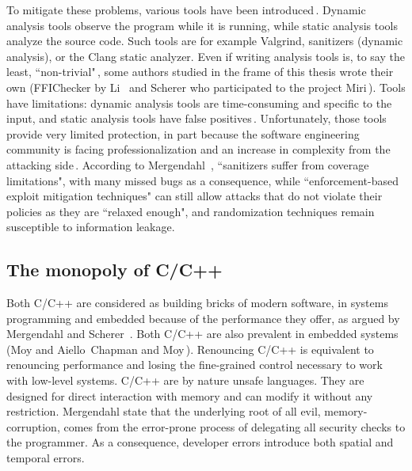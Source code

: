 \documentclass[nomenclature, english, bibtex]{kththesis}
\begin{document}
To mitigate these problems, various tools have been introduced\,\cite{mergendahl_cross-language_2022}. Dynamic analysis tools observe the program while it is running, while static analysis tools analyze the source code. Such tools are for example Valgrind, sanitizers (dynamic analysis), or the Clang static analyzer. Even if writing analysis tools is, to say the least, ``non-trivial"\,\cite{scherer_engineering_2021}, some authors studied in the frame of this thesis wrote their own (FFIChecker by Li \etal\,\cite{li_detecting_2022} and Scherer who participated to the project Miri\,\cite{noauthor_miri_2023}). Tools have limitations: dynamic analysis tools are time-consuming and specific to the input, and static analysis tools have false positives\,\cite{li_improving_2014}.
Unfortunately, those tools provide very limited protection, in part because the software engineering community is facing professionalization and an increase in complexity from the attacking side\,\cite{scherer_engineering_2021, chapman_adacore_2018}. 
According to Mergendahl \etal\,\cite{mergendahl_cross-language_2022}, ``sanitizers suffer from coverage limitations", with many missed bugs as a consequence, while ``enforcement-based exploit mitigation techniques" can still allow attacks that do not violate their policies as they are ``relaxed enough", and randomization techniques remain susceptible to information leakage.
\FloatBarrier



\subsection{The monopoly of C/C++}

Both C/C++ are considered as building bricks of modern software, in systems programming and embedded because of the performance they offer, as argued by Mergendahl \etal and Scherer \,\cite{mergendahl_cross-language_2022, scherer_engineering_2021}. Both C/C++ are also prevalent in embedded systems (Moy and Aiello\,\cite{moy_when_2020} Chapman and Moy\,\cite{chapman_adacore_2018}). Renouncing C/C++ is equivalent to renouncing performance and losing the fine-grained control necessary to work with low-level systems.
C/C++ are by nature unsafe languages. They are designed for direct interaction with memory and can modify it without any restriction. Mergendahl \etal state that the underlying root of all evil, \gls{memory-corruption}, comes from the error-prone process of delegating all security checks to the programmer. As a consequence, developer errors introduce both spatial and temporal errors.
\end{document}
